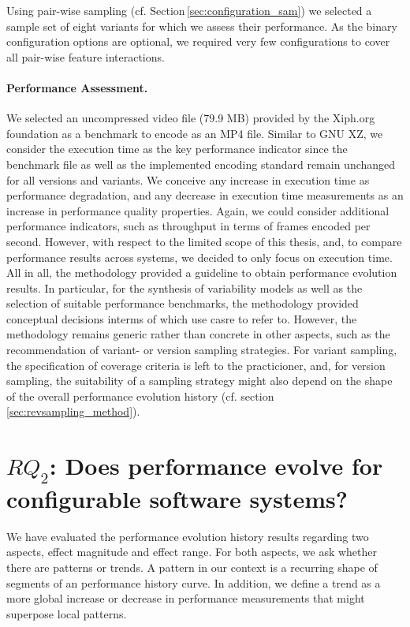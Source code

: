 Using pair-wise sampling (cf. Section\,\ref{sec:configuration_sam}) we selected
a sample set of eight variants for which we assess their performance. As the binary configuration
options are optional, we required very few configurations to cover all
pair-wise feature interactions.

\paragraph{Performance Assessment.} We selected an uncompressed video file (79.9
MB) provided by the Xiph.org foundation as a benchmark to encode as an MP4 file.
Similar to GNU XZ, we consider the execution time as the key performance
indicator since the benchmark file as well as the implemented encoding standard
remain unchanged for all versions and variants. We conceive any increase in
execution time as performance degradation, and any decrease in execution time
measurements as an increase in performance quality properties. Again, we could
consider additional performance indicators, such as throughput in terms of
frames encoded per second. However, with respect to the limited scope of this
thesis, and, to compare performance results across systems, we decided to only
focus on execution time.\\

All in all, the methodology provided a guideline to obtain
performance evolution results. In particular, for the synthesis of variability
models as well as the selection of suitable performance benchmarks, the
methodology provided conceptual decisions interms of which use casre to refer
to. However, the methodology remains generic rather than concrete in other
aspects, such as the recommendation of variant- or version sampling strategies.
For variant sampling, the specification of coverage criteria is left to the
practicioner, and, for version sampling, the suitability of a sampling strategy
might also depend on the shape of the overall performance evolution history
(cf. section\,\ref{sec:revsampling_method}).

\section{$RQ_2$: Does performance evolve for configurable software systems?}\label{sec:expresults}
We have evaluated the performance evolution history results regarding two
aspects, effect magnitude and effect range. For both aspects, we ask whether
there are patterns or trends. A pattern in our context is a recurring shape of
segments of an performance history curve. In addition, we define a trend as a
more global increase or decrease in performance measurements that might
superpose local patterns.

